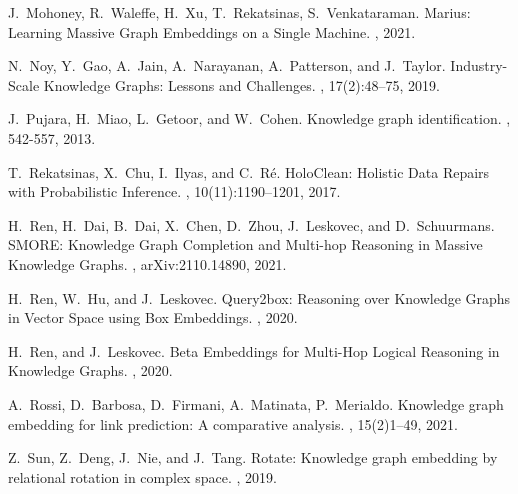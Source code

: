 \documentclass[11pt]{article}
\begin{document}
\begin{thebibliography}{10}
\begin{small}

 J.~Mohoney, R.~Waleffe, H.~Xu, T.~Rekatsinas, S.~Venkataraman. \newblock Marius: Learning Massive Graph Embeddings on a Single Machine. , 2021.


 N.~Noy, Y.~Gao, A.~Jain, A.~Narayanan, A.~Patterson, and J.~Taylor. \newblock Industry-Scale Knowledge Graphs: Lessons and Challenges. , 17(2):48--75, 2019.


 J.~Pujara, H.~Miao, L.~Getoor, and W.~Cohen. \newblock Knowledge graph identification. , 542-557, 2013.


 T.~Rekatsinas, X.~Chu, I.~Ilyas, and C.~R\'{e}. \newblock HoloClean: Holistic Data Repairs with Probabilistic Inference. , 10(11):1190--1201, 2017.

 H.~Ren, H.~Dai, B.~Dai, X.~Chen, D.~Zhou, J.~Leskovec, and D.~Schuurmans. \newblock SMORE: Knowledge Graph Completion and Multi-hop Reasoning in Massive Knowledge Graphs. , arXiv:2110.14890, 2021.

 H.~Ren, W.~Hu, and J.~Leskovec. \newblock Query2box: Reasoning over Knowledge Graphs in Vector Space using Box Embeddings. , 2020.

 H.~Ren, and J.~Leskovec. \newblock Beta Embeddings for Multi-Hop Logical Reasoning in Knowledge Graphs. , 2020.

 A.~Rossi, D.~Barbosa, D.~Firmani, A.~Matinata, P.~Merialdo. \newblock Knowledge graph embedding for link prediction: A comparative analysis. , 15(2)1--49, 2021.

 Z.~Sun, Z.~Deng, J.~Nie, and J.~Tang. \newblock Rotate: Knowledge graph embedding by relational rotation in complex space. , 2019.


\end{small}
\end{thebibliography}
\end{document}
